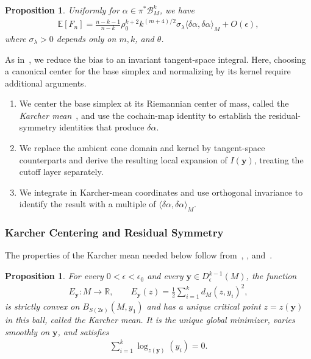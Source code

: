 \documentclass[11pt,reqno]{amsproc}
\numberwithin{equation}{section}
\newcommand{\R}{\mathbb{R}}
\newcommand{\E}{\mathbb{E}}
\newcommand{\by}{\mathbf{y}}
\newcommand{\cB}{\mathcal{B}}
\newcommand{\ball}[3]{B_{#3}(#1, #2)} %
\newtheorem{proposition}[counter]{Proposition}
\theoremstyle{definition}
\theoremstyle{plain}
\begin{document}
\begin{proposition} \label{prop:off_diagonal_bias}
    Uniformly for $\alpha\in \pi^*\cB_M^k$, we have
    \begin{align} \label{eq:off_diagonal_bias_goal}
        \E[F_n] = \frac{n-k-1}{n-k}\rho_0^{k+2}k^{(m+4)/2}\sigma_\lambda \langle \delta\alpha,\delta\alpha\rangle_M + O(\epsilon),
    \end{align}
    where $\sigma_\lambda>0$ depends only on $m,k$, and $\theta$.
\end{proposition}



As in~, we reduce the bias to an invariant tangent-space integral. Here, choosing a canonical center for the base simplex and normalizing by its kernel require additional arguments.
\begin{enumerate}
    \item We center the base simplex at its Riemannian center of mass, called the \emph{Karcher mean}~\cite{karcher_riemannian_1977}, and use the cochain-map identity to establish the residual-symmetry identities that produce $\delta\alpha$.
    \item We replace the ambient cone domain and kernel by tangent-space counterparts and derive the resulting local expansion of $I(\by)$, treating the cutoff layer separately.
    \item We integrate in Karcher-mean coordinates and use orthogonal invariance to identify the result with a multiple of $\langle\delta\alpha,\delta\alpha\rangle_M$.
\end{enumerate}

\subsubsection{Karcher Centering and Residual Symmetry}
The properties of the Karcher mean needed below follow from~\cite{karcher_riemannian_1977}, \cite[Lemma 3]{dyer_riemannian_2015}, and~\cite[Theorems 3.2.1 and 4.3.1]{afsari_means_2009}.
\begin{proposition} \label{prop:karcher}
    For every $0<\epsilon<\epsilon_0$ and every $\by \in D^{k-1}_\epsilon(M)$, the function
    \begin{align}
        E_\by : M \to \R, \qquad E_\by(z) = \frac12 \sum_{i=1}^k d_M(z, y_i)^2,
    \end{align}
    is strictly convex on $\ball{M}{y_1}{S(2\epsilon)}$ and has a unique critical point $z=z(\by)$ in this ball, called the \emph{Karcher mean}. It is the unique global minimizer, varies smoothly on $\by$, and satisfies
    \begin{align} \label{eq:karcher_mean_tangent_zero}
        \sum_{i=1}^k \log_{z(\by)}(y_i) = 0.
    \end{align}
\end{proposition}
\end{document}
